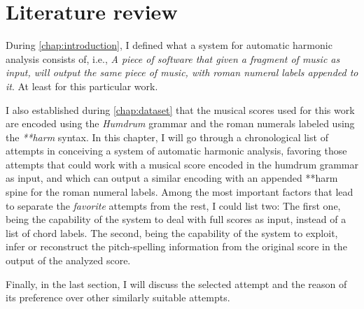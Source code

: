 \chapter{Literature review}
\label{chap:literature-review}
During \autoref{chap:introduction}, I defined what a system for automatic harmonic analysis consists of, i.e., \emph{A piece of software that given a fragment of music as input, will output the same piece of music, with roman numeral labels appended to it}. At least for this particular work.

I also established during \autoref{chap:dataset} that the musical scores used for this work are encoded using the \emph{Humdrum} \cite{humdrum} grammar and the roman numerals labeled using the \emph{**harm} \cite{harm} syntax. In  this chapter, I will go through a chronological list of attempts in conceiving a system of automatic harmonic analysis, favoring those attempts that could work with a musical score encoded in the humdrum grammar as input, and which can output a similar encoding with an appended **harm spine for the roman numeral labels. Among the most important factors that lead to separate the \emph{favorite} attempts from the rest, I could list two: The first one, being the capability of the system to deal with full scores as input, instead of a list of chord labels. The second, being the capability of the system to exploit, infer or reconstruct the pitch-spelling information from the original score in the output of the analyzed score.

Finally, in the last section, I will discuss the selected attempt and the reason of its preference over other similarly suitable attempts.

